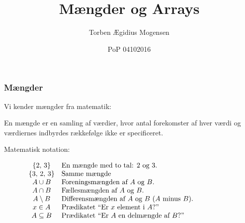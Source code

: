 \documentclass{beamer}
\title{Mængder og Arrays}
\date[2016]{PoP 04102016}
\author{Torben Ægidius Mogensen}
\begin{document}
\begin{frame}
\titlepage
\end{frame}






\begin{frame}
\frametitle{Mængder}

Vi kender mængder fra matematik:

\begin{definition}
En mængde er en samling af værdier, hvor antal forekomster af hver
værdi og værdiernes indbyrdes rækkefølge ikke er specificeret.
\end{definition}

Matematisk notation:

\[\begin{array}{c@{\quad}p{0.7\textwidth}}
\{2,\,3\} & En mængde med to tal: 2 og 3.\\
 \{3,\,2,\,3\} & Samme mængde \\
A \cup B & Foreningsmængden af $A$ og $B$. \\
A \cap B & Fællesmængden af $A$ og $B$. \\
A \setminus B & Differensmængden af $A$ og $B$ ($A$ minus $B$). \\
x \in A & Prædikatet ``Er $x$ element i $A$?''\\
A \subseteq B & Prædikatet ``Er $A$ en delmængde af $B$?''\\
\end{array}\]

\end{frame}
\end{document}
